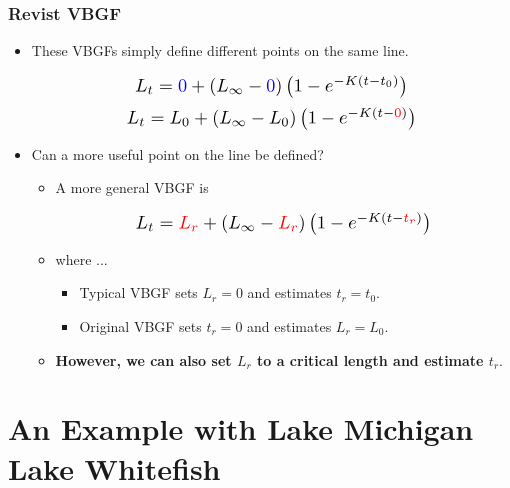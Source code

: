\documentclass[xcolor=dvipsnames]{beamer}\usepackage[]{graphicx}\usepackage[]{color}
\makeatletter
\newcommand*{\Scale}[2][4]{\scalebox{#1}{\ensuremath{#2}}}%
\def\mathcolor#1#{\@mathcolor{#1}}
\def\@mathcolor#1#2#3{%
  \protect\leavevmode
  \begingroup
    \color#1{#2}#3%
  \endgroup
}
\makeatother
\begin{document}
\begin{frame}
\frametitle{Revist VBGF}
\vspace{-12pt}
\begin{itemize}
\item These VBGFs simply define different points on the same line.

\[\Scale[1.3]{ L_{t} = \mathcolor{blue}{0} + (L_{\infty}-\mathcolor{blue}{0})\left(1-e^{-K(t-t_{0})}\right) }\]
\[\Scale[1.3]{ L_{t} = L_{0} + (L_{\infty}-L_{0})\left(1-e^{-K(t-\mathcolor{red}{0})}\right) }\]

\pause
\smallskip
\item Can a more useful point on the line be defined?
  \pause
  \begin{itemize}
    \item A more general VBGF is

\[\Scale[1.3]{ L_{t} = \mathcolor{red}{L_{r}} + (L_{\infty}-\mathcolor{red}{L_{r}})\left(1-e^{-K(t-\mathcolor{red}{t_{r}})}\right) }\]

    \pause
    \item where ...
      \begin{itemize}
        \item Typical VBGF sets $L_{r}=0$ and estimates $t_{r}=t_{0}$.
        \item Original VBGF sets $t_{r}=0$ and estimates $L_{r}=L_{0}$.
      \end{itemize}
    \pause
    \smallskip
    \item \textbf{However, we can also set $L_{r}$ to a critical length and estimate $t_{r}$}.
  \end{itemize}
\end{itemize}
\end{frame}



\section{An Example with Lake Michigan Lake Whitefish}
\end{document}
